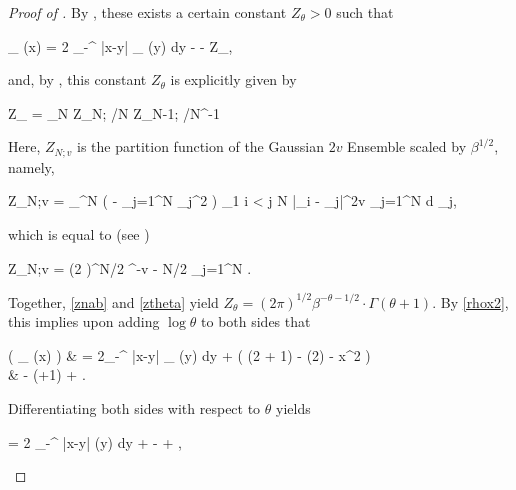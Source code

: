 \documentclass{amsart}
\numberwithin{equation}{section}
\theoremstyle{remark}
\theoremstyle{definition}
\begin{document}
	
	\begin{proof}[Proof of ]  
		
		By \cite[Theorem 3.15]{SERL}, these exists a certain constant $Z_{\theta} > 0$ such that 
		\begin{flalign}
			\label{rhox2} 
			\log \varrho_{\beta} (x) = 2 \theta \displaystyle\int_{-\infty}^{\infty} \log |x-y| \varrho_{\beta} (y) dy - \displaystyle{} - \log Z_{\theta},
		\end{flalign}
		
		\noindent and, by \cite[Section 3]{SERL}, this constant $Z_{\theta}$ is explicitly given by 
		\begin{flalign}
			\label{ztheta} 
			Z_{\theta} = \displaystyle\lim_{N\rightarrow \infty} Z_{N; \theta/N} \cdot Z_{N-1; \theta/N}^{-1}
		\end{flalign}
		
		\noindent Here, $Z_{N; v}$ is the partition function of the Gaussian $2v$ Ensemble scaled by $\beta^{1/2}$, namely,
		\begin{flalign*}
			Z_{N;v} = \displaystyle\int_{^N} \exp \bigg( -\displaystyle{} \sum_{j=1}^N \lambda_j^2 \bigg)  \displaystyle\prod_{1 \le i < j \le N} |\lambda_i - \lambda_j|^{2v} \displaystyle\prod_{j=1}^N d \lambda_j,
		\end{flalign*} 
		
		\noindent which is equal to (see \cite[Equation (2)]{MME})
		\begin{flalign}
			\label{znab} 
			Z_{N;v} = (2 \pi)^{N/2} \beta^{-v  - N/2} \displaystyle\prod_{j=1}^N \displaystyle\frac{\Gamma (1+vj)}{\Gamma (1+v)}.
		\end{flalign}
		
		\noindent Together, \eqref{znab} and \eqref{ztheta} yield $Z_{\theta} = (2\pi)^{1/2} \beta^{-\theta-1/2} \cdot \Gamma (\theta + 1)$. By \eqref{rhox2}, this implies upon adding $\log \theta$ to both sides that
		\begin{flalign*}
			\log ( \theta \cdot \varrho_{\beta} (x) ) & = 2\theta \displaystyle\int_{-\infty}^{\infty} \log |x-y| \varrho_{\beta} (y) dy + \displaystyle{} \cdot \big( (2 \theta + 1) \log \beta - \log (2\pi) - \beta x^2 \big) \\
			& \qquad  - \log \Gamma(\theta+1) + \log \theta.
		\end{flalign*} 
		
		\noindent Differentiating both sides with respect to $\theta$ yields
		\begin{flalign}
			\label{theta0rho} 
			\displaystyle{} = 2 \displaystyle\int_{-\infty}^{\infty} \log|x-y| \varrho (y) dy + \log \beta - \displaystyle{} + \displaystyle\frac{1}{\theta},
		\end{flalign}
		

\end{proof}
\end{document}
